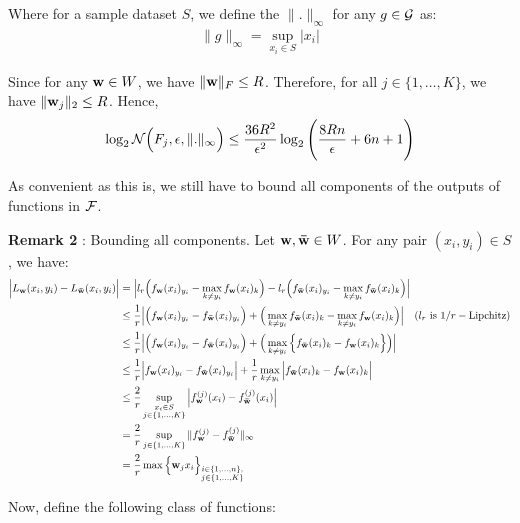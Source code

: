 \noindent Where for a sample dataset $S$, we define the $\|.\|_\infty$ for any $g\in \mathcal{G}$ as:
\begin{align*}
    \|g\|_\infty = \sup_{x_i \in S} |x_i|
\end{align*} 

\noindent Since for any ${\bf w}\in W$, we have $\|{\bf w}\|_F\le R$. Therefore, for all $j\in\{1, \dots, K\}$, we have $\|{\bf w}_j\|_2\le R$. Hence,
\begin{align*}
    \log_2\mathcal{N}\Big( F_j, \epsilon, \|.\|_\infty \Big) \le \frac{36R^2}{\epsilon^2}\log_2\Bigg( \frac{8Rn}{\epsilon} + 6n + 1 \Bigg)
\end{align*}

\noindent \color{red}As convenient as this is, we still have to bound all components of the outputs of functions in $\mathcal{F}$.\color{black}

\noindent\textbf{\newline Remark 2} : Bounding all components.\newline
\noindent Let ${\bf w}, {\bf \bar w}\in W$. For any pair $(x_i, y_i) \in S$, we have:
\begin{align*}
    \Big| L_{\bf w}(x_i, y_i) - L_{\bf \bar w}(x_i, y_i) \Big|
        &= \Big| 
            l_r\Big(  f_{\bf w}(x_i)_{y_i} - \max_{k\ne y_i} f_{\bf w}(x_i)_k  \Big) - l_r\Big(  f_{\bf \bar w}(x_i)_{y_i} - \max_{k\ne y_i} f_{\bf \bar w}(x_i)_k  \Big)
         \Big| \\
        &\le \frac{1}{r}\Big| 
            \Big( f_{\bf w}(x_i)_{y_i} - f_{\bf \bar w}(x_i)_{y_i} \Big) + \Big( \max_{k\ne y_i} f_{\bf \bar w}(x_i)_k - \max_{k\ne y_i} f_{\bf w}(x_i)_k \Big)
         \Big|\ \ \ (l_r \text{ is } 1/r-\text{Lipchitz}) \\
        &\le \frac{1}{r}\Big| 
            \Big( f_{\bf w}(x_i)_{y_i} - f_{\bf \bar w}(x_i)_{y_i} \Big) + \Big( \max_{k\ne y_i} \Big\{ f_{\bf \bar w}(x_i)_k - f_{\bf w}(x_i)_k \Big\} \Big)
         \Big| \\
        &\le \frac{1}{r}\Big| f_{\bf w}(x_i)_{y_i} - f_{\bf \bar w}(x_i)_{y_i} \Big| + \frac{1}{r}\max_{k\ne y_i}\Big| f_{{\bf \bar w}}(x_i)_k - f_{\bf w}(x_i)_k \Big| \\
        &\le \frac{2}{r}\sup_{\substack{x_i \in S \\ j \in \{1, \dots, K\}}}\Big| 
            f_{\bf w}^{(j)}(x_i) - f^{(j)}_{\bf \bar w}(x_i)
         \Big| \\
        &= \frac{2}{r}\sup_{j\in\{1, \dots, K\}} \|f^{(j)}_{\bf w} - f^{(j)}_{\bf \bar w}\|_\infty \\
        &= \frac{2}{r}\max\Big\{ {\bf w}_jx_i \Big\}_{\substack{i\in\{1, \dots, n\}, \\j\in\{1, \dots, K\}}}
\end{align*}

\noindent Now, define the following class of functions:


